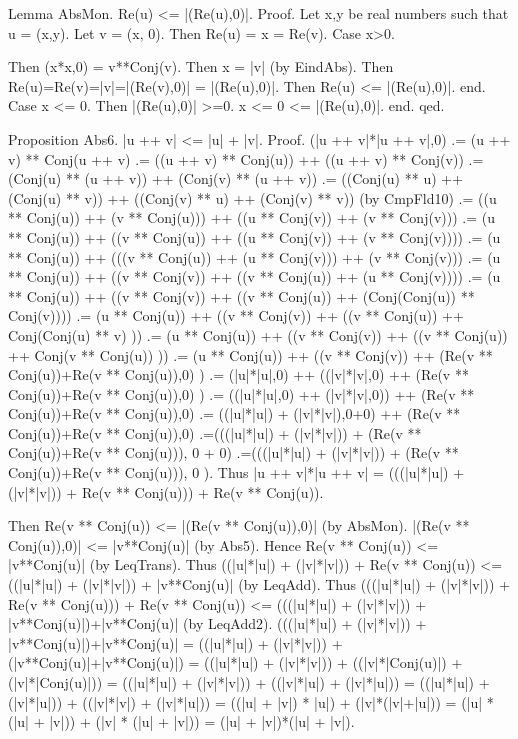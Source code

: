 \documentclass{article}
\newenvironment{forthel}{\begin{leftbar}}{\end{leftbar}}
\begin{document}
\begin{forthel}
Lemma AbsMon. Re(u) <= |(Re(u),0)|.
Proof.
Let x,y be real numbers such that u = (x,y).
Let v = (x, 0).
Then Re(u) = x = Re(v).
Case x>0.

Then (x*x,0) = v**Conj(v).
Then x = |v| (by EindAbs).
Then Re(u)=Re(v)=|v|=|(Re(v),0)| = |(Re(u),0)|.
Then Re(u) <= |(Re(u),0)|.
end.
Case x <= 0.
Then |(Re(u),0)| >=0.
x <= 0 <= |(Re(u),0)|.
end.
qed.

Proposition Abs6. |u ++ v| <= |u| + |v|.
Proof. (|u ++ v|*|u ++ v|,0)	.= (u ++ v) ** Conj(u ++ v)
.=  ((u ++ v) ** Conj(u)) ++ ((u ++ v) ** Conj(v)) 
.=  (Conj(u) ** (u ++ v)) ++ (Conj(v) ** (u ++ v)) 
.=  ((Conj(u) ** u) ++ (Conj(u) ** v)) ++ ((Conj(v) ** u) ++ (Conj(v) ** v)) (by CmpFld10)
.=  ((u ** Conj(u)) ++ (v ** Conj(u))) ++ ((u ** Conj(v)) ++ (v ** Conj(v)))
.=  (u ** Conj(u)) ++ ((v ** Conj(u)) ++ ((u ** Conj(v)) ++ (v ** Conj(v))))
.=  (u ** Conj(u)) ++ (((v ** Conj(u)) ++ (u ** Conj(v))) ++ (v ** Conj(v)))
.=  (u ** Conj(u)) ++ ((v ** Conj(v)) ++ ((v ** Conj(u)) ++ (u ** Conj(v)))) 
.=  (u ** Conj(u)) ++ ((v ** Conj(v)) ++ ((v ** Conj(u)) ++ (Conj(Conj(u)) ** Conj(v))))
.=  (u ** Conj(u)) ++ ((v ** Conj(v)) ++ ((v ** Conj(u)) ++ Conj(Conj(u) ** v) ))
.=  (u ** Conj(u)) ++ ((v ** Conj(v)) ++ ((v ** Conj(u)) ++ Conj(v ** Conj(u)) ))
.=  (u ** Conj(u)) ++ ((v ** Conj(v)) ++ (Re(v ** Conj(u))+Re(v ** Conj(u)),0) )
.=  (|u|*|u|,0) ++ ((|v|*|v|,0) ++ (Re(v ** Conj(u))+Re(v ** Conj(u)),0) )
.=  ((|u|*|u|,0) ++ (|v|*|v|,0)) ++ (Re(v ** Conj(u))+Re(v ** Conj(u)),0)
.= ((|u|*|u|) + (|v|*|v|),0+0) ++ (Re(v ** Conj(u))+Re(v ** Conj(u)),0)
.=(((|u|*|u|) + (|v|*|v|)) + (Re(v ** Conj(u))+Re(v ** Conj(u))), 0 + 0)
.=(((|u|*|u|) + (|v|*|v|)) + (Re(v ** Conj(u))+Re(v ** Conj(u))), 0 ).
Thus |u ++ v|*|u ++ v| = (((|u|*|u|) + (|v|*|v|)) + Re(v ** Conj(u))) + Re(v ** Conj(u)).


Then Re(v ** Conj(u)) <= |(Re(v ** Conj(u)),0)| (by AbsMon). |(Re(v ** Conj(u)),0)| <= |v**Conj(u)| (by Abs5).
Hence Re(v ** Conj(u)) <= |v**Conj(u)| (by LeqTrans).
Thus ((|u|*|u|) + (|v|*|v|)) + Re(v ** Conj(u)) <= ((|u|*|u|) + (|v|*|v|)) + |v**Conj(u)| (by LeqAdd).
Thus (((|u|*|u|) + (|v|*|v|)) + Re(v ** Conj(u))) + Re(v ** Conj(u)) <= (((|u|*|u|) + (|v|*|v|)) + |v**Conj(u)|)+|v**Conj(u)| (by LeqAdd2).
(((|u|*|u|) + (|v|*|v|)) + |v**Conj(u)|)+|v**Conj(u)|
= ((|u|*|u|) + (|v|*|v|)) + (|v**Conj(u)|+|v**Conj(u)|) 
= ((|u|*|u|) + (|v|*|v|)) + ((|v|*|Conj(u)|) + (|v|*|Conj(u)|))
= ((|u|*|u|) + (|v|*|v|)) + ((|v|*|u|) + (|v|*|u|))
= ((|u|*|u|) + (|v|*|u|)) + ((|v|*|v|) + (|v|*|u|))
= ((|u| + |v|) * |u|) + (|v|*(|v|+|u|))
= (|u| * (|u| + |v|)) + (|v| * (|u| + |v|))
= (|u| + |v|)*(|u| + |v|).


\end{forthel}
\end{document}
